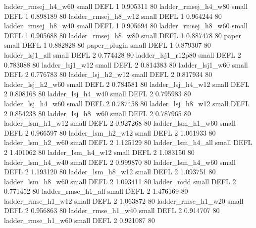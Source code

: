      ladder_rmsej_h4_w60      small     DEFL                 1 0.905311 80
     ladder_rmsej_h4_w80      small     DEFL                 1 0.898189 80
     ladder_rmsej_h8_w12      small     DEFL                 1 0.964244 80
     ladder_rmsej_h8_w40      small     DEFL                 1 0.905694 80
     ladder_rmsej_h8_w60      small     DEFL                 1 0.905688 80
     ladder_rmsej_h8_w80      small     DEFL                 1 0.887478 80
                   paper      small     DEFL                 1 0.882828 80
            paper_plugin      small     DEFL                 1 0.879307 80
         ladder_lsj1_all      small     DEFL                 2 0.774428 80
      ladder_lsj1_r12p80      small     DEFL                 2 0.783088 80
         ladder_lsj1_w12      small     DEFL                 2 0.814383 80
         ladder_lsj1_w60      small     DEFL                 2 0.776783 80
       ladder_lsj_h2_w12      small     DEFL                 2 0.817934 80
       ladder_lsj_h2_w60      small     DEFL                 2 0.784581 80
       ladder_lsj_h4_w12      small     DEFL                 2 0.808168 80
       ladder_lsj_h4_w40      small     DEFL                 2 0.795983 80
       ladder_lsj_h4_w60      small     DEFL                 2 0.787458 80
       ladder_lsj_h8_w12      small     DEFL                 2 0.854238 80
       ladder_lsj_h8_w60      small     DEFL                 2 0.787965 80
       ladder_lsm_h1_w12      small     DEFL                 2 0.927268 80
       ladder_lsm_h1_w60      small     DEFL                 2 0.966597 80
       ladder_lsm_h2_w12      small     DEFL                 2 1.061933 80
       ladder_lsm_h2_w60      small     DEFL                 2 1.125129 80
       ladder_lsm_h4_all      small     DEFL                 2 1.401062 80
       ladder_lsm_h4_w12      small     DEFL                 2 1.083150 80
       ladder_lsm_h4_w40      small     DEFL                 2 0.999870 80
       ladder_lsm_h4_w60      small     DEFL                 2 1.193120 80
       ladder_lsm_h8_w12      small     DEFL                 2 1.093751 80
       ladder_lsm_h8_w60      small     DEFL                 2 1.093411 80
              ladder_mdd      small     DEFL                 2 0.771452 80
      ladder_rmse_h1_all      small     DEFL                 2 1.476169 80
      ladder_rmse_h1_w12      small     DEFL                 2 1.063872 80
      ladder_rmse_h1_w20      small     DEFL                 2 0.956863 80
      ladder_rmse_h1_w40      small     DEFL                 2 0.914707 80
      ladder_rmse_h1_w60      small     DEFL                 2 0.921087 80
